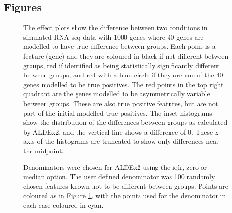 \documentclass{bmcart}
\def\texttt{[image: ]}
\begin{document}
\begin{backmatter}



\section*{Figures}

\begin{figure}[h!]
\caption{ The effect plots show the difference between two conditions in simulated RNA-seq data with 1000 genes where 40 genes are modelled to have true difference between groups. Each point is a feature (gene) and they are coloured in black if not different between groups, red if identified as being statistically significantly different between groups, and red with a blue circle if they are one of the 40  genes modelled to be  true positives. The red points in the top right quadrant are the genes modelled to be asymmetrically variable between groups. These are also true positive features, but are not part of the initial modelled true positives. The inset histograms show the distribution of the differences between groups as calculated by ALDEx2, and the vertical line shows a difference of 0. These x-axis of the histograms are truncated to show only differences near the midpoint.}
\label{Fig:f1a}
\end{figure}

\begin{figure}[h!]
\caption{ Denominators were chosen for ALDEx2 using the iqlr, zero or median option. The user defined denominator was 100 randomly chosen features known not to be different between groups. Points are coloured as in Figure \ref{Fig:f1a}, with the points used for the denominator in each case coloured in cyan.}
\label{Fig:f2a}
\end{figure}


\end{backmatter}
\end{document}
